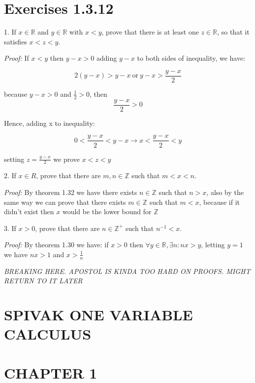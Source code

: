 \documentclass[a4paper, 11pt]{article}
\begin{document}
\section*{Exercises 1.3.12}

\hrulefill

1. If $x \in \mathbb{R}$ and $y \in \mathbb{R}$ with $x < y$, prove that there is at least one $z \in \mathbb{R}$, so that it satisfies $x < z < y$.

\emph{Proof:} If $x < y$ then $y - x > 0$ adding $y - x$ to both sides of inequality, we have:

$$2(y - x) > y - x \ \textrm{or} \ y - x > \frac{y - x}{2}$$

because $y - x > 0$ and $\frac{1}{2} > 0$, then 
$$\frac{y - x}{2} > 0$$

Hence, adding x to inequality:

$$0 < \frac{y - x}{2} < y - x \rightarrow x < \frac{y - x}{2} < y$$

setting $z = \frac{y - x}{2}$ we prove $x < z < y$

\hrulefill

2. If $x \in R$, prove that there are $m, n \in \mathbb{Z}$ such that $m < x < n$.

\emph{Proof:} By theorem 1.32 we have there exists $n \in \mathbb{Z}$ such that
$n > x$, also by the same way we can prove that there exists $m \in \mathbb{Z}$
such that $m < x$, because if it didn't exist then $x$ would be the lower bound
for $\mathbb{Z}$

\hrulefill

3. If $x > 0$, prove that there are $n \in \mathbb{Z}^+$ such that $n^{-1} < x$.

\emph{Proof:} By theorem 1.30 we have: if $x > 0$ then $\forall y \in \mathbb{R}, \exists n : nx > y$,
letting $y = 1$ we have $nx > 1$ and $x > \frac{1}{n}$

\hrulefill

\emph{BREAKING HERE. APOSTOL IS KINDA TOO HARD ON PROOFS. MIGHT RETURN TO IT LATER}

\section*{SPIVAK ONE VARIABLE CALCULUS}
\section*{CHAPTER 1}
\end{document}
